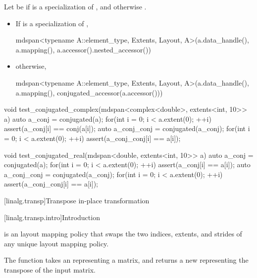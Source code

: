 \begin{itemdescr}
\pnum
Let  be
if  is a specialization of , and
otherwise .

\pnum
\returns
\begin{itemize}
\item
If  is a specialization of ,
\begin{codeblock}
mdspan<typename A::element_type, Extents, Layout, A>(a.data_handle(), a.mapping(),
                                                     a.accessor().nested_accessor())
\end{codeblock}
\item
otherwise,
\begin{codeblock}
mdspan<typename A::element_type, Extents, Layout, A>(a.data_handle(), a.mapping(),
                                                     conjugated_accessor(a.accessor()))
\end{codeblock}
\end{itemize}
\end{itemdescr}

\pnum
\begin{example}
\begin{codeblock}
void test_conjugated_complex(mdspan<complex<double>, extents<int, 10>> a) {
  auto a_conj = conjugated(a);
  for(int i = 0; i < a.extent(0); ++i) {
    assert(a_conj[i] == conj(a[i]);
  }
  auto a_conj_conj = conjugated(a_conj);
  for(int i = 0; i < a.extent(0); ++i) {
    assert(a_conj_conj[i] == a[i]);
  }
}

void test_conjugated_real(mdspan<double, extents<int, 10>> a) {
  auto a_conj = conjugated(a);
  for(int i = 0; i < a.extent(0); ++i) {
    assert(a_conj[i] == a[i]);
  }
  auto a_conj_conj = conjugated(a_conj);
  for(int i = 0; i < a.extent(0); ++i) {
    assert(a_conj_conj[i] == a[i]);
  }
}
\end{codeblock}
\end{example}

[linalg.transp]{Transpose in-place transformation}

[linalg.transp.intro]{Introduction}

\pnum
{} is an  layout mapping policy
that swaps the two indices, extents, and strides
of any unique  layout mapping policy.

\pnum
The  function takes an 
representing a matrix, and returns a new 
representing the transpose of the input matrix.

